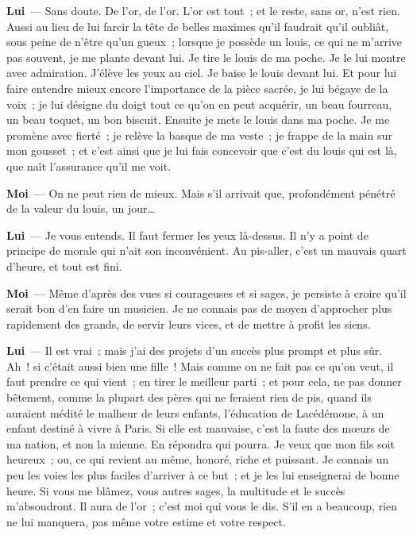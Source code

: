 \documentclass[french,twoside]{book} %
\newcommand{\labelchar}[1]{\textbf{\color{rubric} #1}}
\begin{document}
\labelchar{Lui} — Sans doute. De l’or, de l’or. L’or est tout ; et le reste, sans or, n’est rien. Aussi au lieu de lui farcir la tête de belles maximes qu’il faudrait qu’il oubliât, sous peine de n’être qu’un gueux ; lorsque je possède un louis, ce qui ne m’arrive pas souvent, je me plante devant lui. Je tire le louis de ma poche. Je le lui montre avec admiration. J’élève les yeux au ciel. Je baise le louis devant lui. Et pour lui faire entendre mieux encore l’importance de la pièce sacrée, je lui bégaye de la voix ; je lui désigne du doigt tout ce qu’on en peut acquérir, un beau fourreau, un beau toquet, un bon biscuit. Ensuite je mets le louis dans ma poche. Je me promène avec fierté ; je relève la basque de ma veste ; je frappe de la main sur mon gousset ; et c’est ainsi que je lui fais concevoir que c’est du louis qui est là, que naît l’assurance qu’il me voit.\par
\labelchar{Moi} — On ne peut rien de mieux. Mais s’il arrivait que, profondément pénétré de la valeur du louis, un jour…\par
\labelchar{Lui} — Je vous entends. Il faut fermer les yeux là-dessus. Il n’y a point de principe de morale qui n’ait son inconvénient. Au pis-aller, c’est un mauvais quart d’heure, et tout est fini.\par
\labelchar{Moi} — Même d’après des vues si courageuses et si sages, je persiste à croire qu’il serait bon d’en faire un musicien. Je ne connais pas de moyen d’approcher plus rapidement des grands, de servir leurs vices, et de mettre à profit les siens.\par
\labelchar{Lui} — Il est vrai ; mais j’ai des projets d’un succès plus prompt et plus sûr. Ah ! si c’était aussi bien une fille ! Mais comme on ne fait pas ce qu’on veut, il faut prendre ce qui vient ; en tirer le meilleur parti ; et pour cela, ne pas donner bêtement, comme la plupart des pères qui ne feraient rien de pis, quand ils auraient médité le malheur de leurs enfants, l’éducation de Lacédémone, à un enfant destiné à vivre à Paris. Si elle est mauvaise, c’est la faute des mœurs de ma nation, et non la mienne. En répondra qui pourra. Je veux que mon fils soit heureux ; ou, ce qui revient au même, honoré, riche et puissant. Je connais un peu les voies les plus faciles d’arriver à ce but ; et je les lui enseignerai de bonne heure. Si vous me blâmez, vous autres sages, la multitude et le succès m’absoudront. Il aura de l’or ; c’est moi qui vous le dis. S’il en a beaucoup, rien ne lui manquera, pas même votre estime et votre respect.\par
\end{document}
